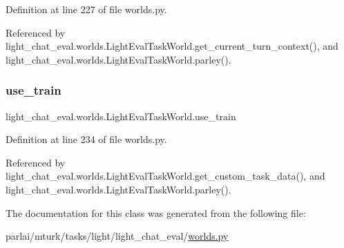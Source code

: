 Definition at line 227 of file worlds.\+py.



Referenced by light\+\_\+chat\+\_\+eval.\+worlds.\+Light\+Eval\+Task\+World.\+get\+\_\+current\+\_\+turn\+\_\+context(), and light\+\_\+chat\+\_\+eval.\+worlds.\+Light\+Eval\+Task\+World.\+parley().

\mbox{\label{classlight__chat__eval_1_1worlds_1_1LightEvalTaskWorld_ad605071600d13b139e24541051eb4afb}} 
\subsubsection{\texorpdfstring{use\+\_\+train}{use\_train}}
{\footnotesize\ttfamily light\+\_\+chat\+\_\+eval.\+worlds.\+Light\+Eval\+Task\+World.\+use\+\_\+train}



Definition at line 234 of file worlds.\+py.



Referenced by light\+\_\+chat\+\_\+eval.\+worlds.\+Light\+Eval\+Task\+World.\+get\+\_\+custom\+\_\+task\+\_\+data(), and light\+\_\+chat\+\_\+eval.\+worlds.\+Light\+Eval\+Task\+World.\+parley().



The documentation for this class was generated from the following file\+:\begin{DoxyCompactItemize}
\item 
parlai/mturk/tasks/light/light\+\_\+chat\+\_\+eval/\hyperlink{parlai_2mturk_2tasks_2light_2light__chat__eval_2worlds_8py}{worlds.\+py}\end{DoxyCompactItemize}
